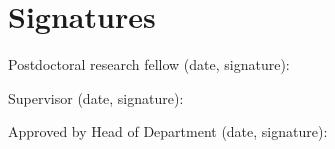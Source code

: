 \documentclass{article}
\begin{document}
\section{Signatures}

    Postdoctoral research fellow (date, signature):

    Supervisor (date, signature):

    Approved by Head of Department (date, signature):


\end{document}
